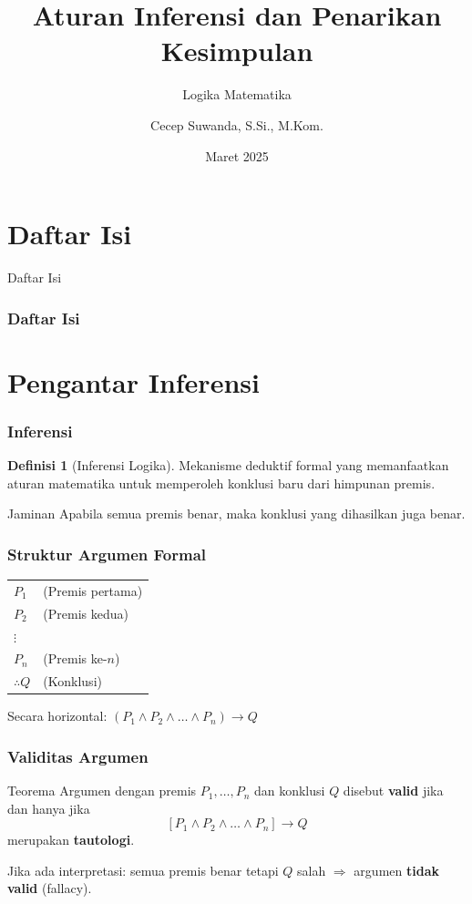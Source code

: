 \documentclass[handout]{beamer}
\subtitle[Logika Matematika]{Logika Matematika}
\title[Aturan Inferensi]{Aturan Inferensi dan Penarikan Kesimpulan}
\author{Cecep Suwanda, S.Si., M.Kom.}
\date{Maret 2025}
\institute{Universitas Bale Bandung}
\theoremstyle{definition}
\newtheorem{definisi}[theorem]{Definisi}
\theoremstyle{example}
\begin{document}
\maketitle

\section*{Daftar Isi}
\begin{frame}{Daftar Isi}
\frametitle{Daftar Isi}
\tableofcontents
\end{frame}

\section{Pengantar Inferensi}

\begin{frame}
\frametitle{Inferensi}
\begin{definisi}[Inferensi Logika]
Mekanisme deduktif formal yang memanfaatkan aturan matematika untuk memperoleh konklusi baru dari himpunan premis.
\end{definisi}
\begin{block}{Jaminan}
Apabila semua premis benar, maka konklusi yang dihasilkan juga benar.
\end{block}
\end{frame}

\begin{frame}
\frametitle{Struktur Argumen Formal}
\begin{center}
\begin{tabular}{ll}
$P_1$ & (Premis pertama) \\
$P_2$ & (Premis kedua) \\
$\vdots$ & \\
$P_n$ & (Premis ke-$n$) \\
\hline
$\therefore Q$ & (Konklusi)
\end{tabular}
\end{center}
\vspace{0.3cm}
Secara horizontal: $(P_1 \wedge P_2 \wedge \ldots \wedge P_n) \rightarrow Q$
\end{frame}

\begin{frame}
\frametitle{Validitas Argumen}
\begin{block}{Teorema}
Argumen dengan premis $P_1, \ldots, P_n$ dan konklusi $Q$ disebut \textbf{valid} jika dan hanya jika
\[ [P_1 \wedge P_2 \wedge \ldots \wedge P_n] \rightarrow Q \]
merupakan \textbf{tautologi}.
\end{block}
\begin{block}{}
Jika ada interpretasi: semua premis benar tetapi $Q$ salah $\Rightarrow$ argumen \textbf{tidak valid} (fallacy).
\end{block}
\end{frame}
\end{document}
